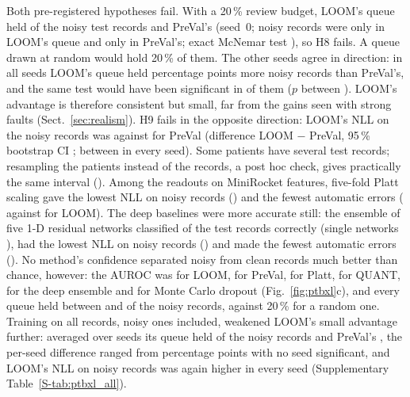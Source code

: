 \documentclass[preprint,12pt,authoryear]{elsarticle}
\begin{document}
Both pre-registered hypotheses fail. With a 20\,\% review budget, LOOM's queue held \PTBHEightCaughtLoom{} of the \PTBTestNoisy{} noisy test records and PreVal's \PTBHEightCaughtPreVal{} (seed~0; \PTBHEightLoomOnly{} noisy records were only in LOOM's queue and \PTBHEightPreValOnly{} only in PreVal's; exact McNemar test \citep{mcnemar1947} \PTBHEightP), so H8 fails. A queue drawn at random would hold 20\,\% of them. The other seeds agree in direction: in all \PTBNSeeds{} seeds LOOM's queue held \PTBHEightDiffRange{} percentage points more noisy records than PreVal's, and the same test would have been significant in \PTBHEightSeedsPass{} of them ($p$ between \PTBHEightPRange). LOOM's advantage is therefore consistent but small, far from the gains seen with strong faults (Sect.~\ref{sec:realism}). H9 fails in the opposite direction: LOOM's NLL on the noisy records was \PTBHNineLoom{} against \PTBHNinePreVal{} for PreVal (difference LOOM $-$ PreVal, 95\,\% bootstrap CI \PTBHNineCI; between \PTBHNineDiffRange{} in every seed). Some patients have several test records; resampling the \ClusterPatients{} patients instead of the records, a post hoc check, gives practically the same interval (\ClusterNLLCI). Among the readouts on MiniRocket features, five-fold Platt scaling gave the lowest NLL on noisy records (\PTBNLLNoisyPlatt) and the fewest automatic errors (\PTBErrPlatt{} against \PTBErrLoom{} for LOOM). The deep baselines were more accurate still: the ensemble of five 1-D residual networks classified \PTBAccDeepEns{} of the test records correctly (single networks \PTBAccDeepRange), had the lowest NLL on noisy records (\PTBNLLNoisyDeepEns) and made the fewest automatic errors (\PTBErrDeepEns). No method's confidence separated noisy from clean records much better than chance, however: the AUROC was \PTBDetLoom{} for LOOM, \PTBDetPreVal{} for PreVal, \PTBDetPlatt{} for Platt, \PTBDetQuant{} for QUANT, \PTBDetDeepEns{} for the deep ensemble and \PTBDetMCDrop{} for Monte Carlo dropout (Fig.~\ref{fig:ptbxl}c), and every queue held between \PTBCaughtQuant{} and \PTBCaughtLoom{} of the noisy records, against 20\,\% for a random one. Training on all records, noisy ones included, weakened LOOM's small advantage further: averaged over seeds its queue held \PTBAllCaughtLoom{} of the noisy records and PreVal's \PTBAllCaughtPreVal, the per-seed difference ranged from \PTBAllHEightDiffRange{} percentage points with no seed significant, and LOOM's NLL on noisy records was again higher in every seed (Supplementary Table~\ref{S-tab:ptbxl_all}).
\end{document}
